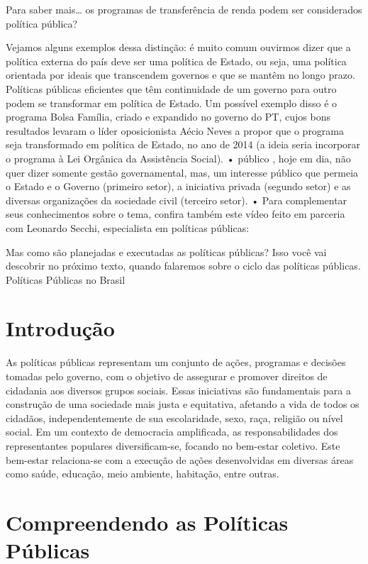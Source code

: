 \documentclass[
   article,       
   12pt,          
   oneside,       
   a4paper,       
   english,       
   brazil,        
   sumario=tradicional
   ]{abntex2}
\begin{document}
Para saber mais… os programas de transferência de renda podem ser considerados política pública?

Vejamos alguns exemplos dessa distinção: é muito comum ouvirmos dizer que a política externa do país deve ser uma política de Estado, ou seja, uma política orientada por ideais que transcendem governos e que se mantêm no longo prazo. Políticas públicas eficientes que têm continuidade de um governo para outro podem se transformar em política de Estado. Um possível exemplo disso é o programa Bolsa Família, criado e expandido no governo do PT, cujos bons resultados levaram o líder oposicionista Aécio Neves a propor que o programa seja transformado em política de Estado, no ano de 2014 (a ideia seria incorporar o programa à Lei Orgânica da Assistência Social).
• público , hoje em dia, não quer dizer somente gestão governamental, mas, um interesse público que permeia o Estado e o Governo (primeiro setor), a iniciativa privada (segundo setor) e as diversas organizações da sociedade civil (terceiro setor).
• Para complementar seus conhecimentos sobre o tema, confira também este vídeo feito em parceria com Leonardo Secchi, especialista em políticas públicas:

Mas como são planejadas e executadas as políticas públicas? Isso você vai descobrir no próximo texto, quando falaremos sobre o ciclo das políticas públicas. 
Políticas Públicas no Brasil

\section{Introdução}

As políticas públicas representam um conjunto de ações, programas e decisões tomadas pelo governo, com o objetivo de assegurar e promover direitos de cidadania aos diversos grupos sociais. Essas iniciativas são fundamentais para a construção de uma sociedade mais justa e equitativa, afetando a vida de todos os cidadãos, independentemente de sua escolaridade, sexo, raça, religião ou nível social. Em um contexto de democracia amplificada, as responsabilidades dos representantes populares diversificam-se, focando no bem-estar coletivo. Este bem-estar relaciona-se com a execução de ações desenvolvidas em diversas áreas como saúde, educação, meio ambiente, habitação, entre outras.

\section{Compreendendo as Políticas Públicas}
\end{document}
